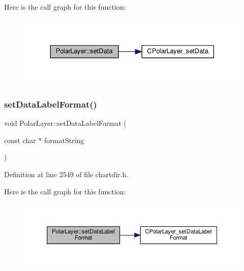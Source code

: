 Here is the call graph for this function\+:
\nopagebreak
\begin{figure}[H]
\begin{center}
\leavevmode
\includegraphics[width=330pt]{class_polar_layer_a0a1aa3f4b5c9545790e46be367104dcc_cgraph}
\end{center}
\end{figure}
\mbox{\label{class_polar_layer_a49d26c013a3f7ed01329306a2c8ff075}} 
\subsubsection{\texorpdfstring{set\+Data\+Label\+Format()}{setDataLabelFormat()}}
{\footnotesize\ttfamily void Polar\+Layer\+::set\+Data\+Label\+Format (\begin{DoxyParamCaption}\item[{const char $\ast$}]{format\+String }\end{DoxyParamCaption})\hspace{0.3cm}{\ttfamily [inline]}}



Definition at line 2549 of file chartdir.\+h.

Here is the call graph for this function\+:
\nopagebreak
\begin{figure}[H]
\begin{center}
\leavevmode
\includegraphics[width=350pt]{class_polar_layer_a49d26c013a3f7ed01329306a2c8ff075_cgraph}
\end{center}
\end{figure}
\mbox{\label{class_polar_layer_ac9e8ab5fbec672ba966af4b6b7eda14c}} 
